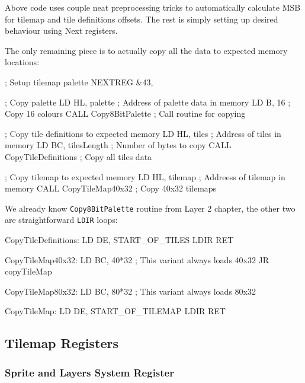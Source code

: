 Above code uses couple neat preprocessing tricks to automatically calculate MSB for tilemap and tile definitions offsets. The rest is simply setting up desired behaviour using Next registers.

\pagebreak
The only remaining piece is to actually copy all the data to expected memory locations:

\begin{tcblisting}{}
	; Setup tilemap palette
	NEXTREG &43, %

	; Copy palette
	LD HL, palette               ; Address of palette data in memory
	LD B, 16                     ; Copy 16 colours
	CALL Copy8BitPalette         ; Call routine for copying

	; Copy tile definitions to expected memory
	LD HL, tiles                 ; Address of tiles in memory
	LD BC, tilesLength           ; Number of bytes to copy
	CALL CopyTileDefinitions     ; Copy all tiles data

	; Copy tilemap to expected memory
	LD HL, tilemap               ; Addreess of tilemap in memory
	CALL CopyTileMap40x32        ; Copy 40x32 tilemaps
\end{tcblisting}

We already know {\tt Copy8BitPalette} routine from Layer 2 chapter, the other two are straightforward {\tt LDIR} loops:

\begin{tcblisting}{}
CopyTileDefinitions:
	LD DE, START_OF_TILES
	LDIR
	RET

CopyTileMap40x32:
	LD BC, 40*32		; This variant always loads 40x32
	JR copyTileMap

CopyTileMap80x32:
	LD BC, 80*32		; This variant always loads 80x32

CopyTileMap:
	LD DE, START_OF_TILEMAP
	LDIR
	RET
\end{tcblisting}


\pagebreak
\subsection{Tilemap Registers}
\label{zx_next_tilemap_registers}

\subsubsection{Sprite and Layers System Register }

